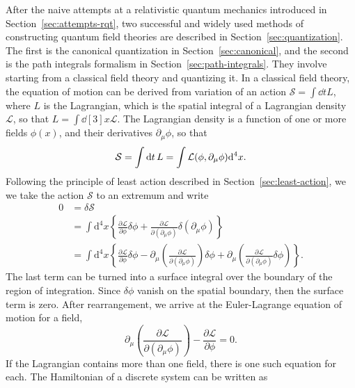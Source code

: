 After the naive attempts at a relativistic quantum mechanics introduced in Section~\ref{sec:attempts-rqt}, two successful and widely used methods of constructing quantum field theories are described in Section~\ref{sec:quantization}. The first is the canonical quantization in Section~\ref{sec:canonical}, and the second is the path integrals formalism in Section~\ref{sec:path-integrals}. They involve starting from a classical field theory and quantizing it. In a classical field theory, the equation of motion can be derived from variation of an action $\mathcal{S}=\int \dd{t}L$, where $L$ is the Lagrangian, which is the spatial integral of a Lagrangian density $\mathcal{L}$, so that $L=\int \dd[3]x\mathcal{L}$. The Lagrangian density is a function of one or more fields $\phi(x)$, and their derivatives $\partial_{\mu}\phi$, so that
\begin{equation}
\mathcal{S}=\int \dd{t}L=\int \mathcal{L}\qty(\phi,\partial_{\mu}\phi)\dd[4]x.
\end{equation}
Following the principle of least action described in Section~\ref{sec:least-action}, we we take the action $\mathcal{S}$ to an extremum and write
\begin{equation}
\begin{split}
0 & =  \delta \mathcal{S} \\
& = \int \mathrm{d}^4 x \left\lbrace \frac{\partial\mathcal{L}}{\partial\phi}\delta\phi + \frac{\partial\mathcal{L}}{\partial\left(\partial_\mu\phi\right)}\delta\left(\partial_\mu\phi\right) \right\rbrace \\
& = \int \mathrm{d}^4 x \left\lbrace \frac{\partial\mathcal{L}}{\partial\phi}\delta\phi - \partial_\mu \left(   \frac{\partial\mathcal{L}}{\partial\left(\partial_\mu\phi\right)} \right) \delta\phi   +   \partial_\mu \left(   \frac{\partial\mathcal{L}}{\partial\left(\partial_\mu\phi\right)}  \delta\phi \right) \right\rbrace .
\end{split}
\end{equation}
The last term can be turned into a surface integral over the boundary of the region of integration. Since $\delta\phi$ vanish on the spatial boundary, then the surface term is zero. After rearrangement, we arrive at the Euler-Lagrange equation of motion for a field,  
\begin{equation}
\partial_\mu \left(   \frac{\partial\mathcal{L}}{\partial\left(\partial_\mu\phi\right)} \right) - \frac{\partial\mathcal{L}}{\partial\phi} = 0 .
\end{equation}
If the Lagrangian contains more than one field, there is one such equation for each. The Hamiltonian of a discrete system can be written as
